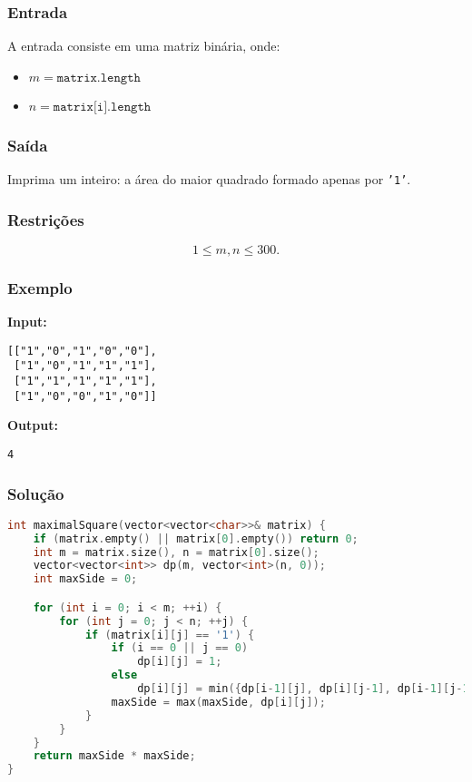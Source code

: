 \subsubsection*{Entrada}
A entrada consiste em uma matriz binária, onde:
\begin{itemize}
    \item \(m = \texttt{matrix.length}\)
    \item \(n = \texttt{matrix[i].length}\)
\end{itemize}

\subsubsection*{Saída}
Imprima um inteiro: a área do maior quadrado formado apenas por \texttt{'1'}.

\subsubsection*{Restrições}
\[
1 \le m, n \le 300.
\]

\subsubsection*{Exemplo}

\textbf{Input:}
\begin{verbatim}
[["1","0","1","0","0"],
 ["1","0","1","1","1"],
 ["1","1","1","1","1"],
 ["1","0","0","1","0"]]
\end{verbatim}

\textbf{Output:}
\begin{verbatim}
4
\end{verbatim}

\subsubsection*{Solução}
\begin{lstlisting}[language=C++]
int maximalSquare(vector<vector<char>>& matrix) {
    if (matrix.empty() || matrix[0].empty()) return 0;
    int m = matrix.size(), n = matrix[0].size();
    vector<vector<int>> dp(m, vector<int>(n, 0));
    int maxSide = 0;

    for (int i = 0; i < m; ++i) {
        for (int j = 0; j < n; ++j) {
            if (matrix[i][j] == '1') {
                if (i == 0 || j == 0)
                    dp[i][j] = 1;
                else
                    dp[i][j] = min({dp[i-1][j], dp[i][j-1], dp[i-1][j-1]}) + 1;
                maxSide = max(maxSide, dp[i][j]);
            }
        }
    }
    return maxSide * maxSide;
}
\end{lstlisting}

